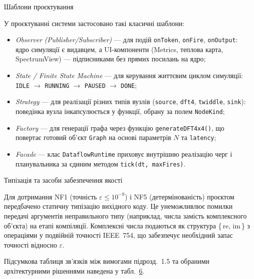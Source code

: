\protect{}\label{_Toc228121448}{}Шаблони проєктування

У проєктуванні системи застосовано такі класичні шаблони:

\begin{itemize}
\item
  \emph{Observer (Publisher/Subscriber)} --- для подій \texttt{onToken},
  \texttt{onFire}, \texttt{onOutput}: ядро симуляції є видавцем, а
  UI-компоненти (Metrics, теплова карта, SpectrumView) --- підписниками
  без прямих посилань на ядро;
\item
  \emph{State / Finite State Machine} --- для керування життєвим циклом
  симуляції: \texttt{IDLE} \(\rightarrow\) \texttt{RUNNING}
  \(\rightarrow\) \texttt{PAUSED} \(\rightarrow\) \texttt{DONE};
\item
  \emph{Strategy} --- для реалізації різних типів вузлів
  (\texttt{source}, \texttt{dft4}, \texttt{twiddle}, \texttt{sink}):
  поведінка вузла інкапсулюється у функції, обрану за полем
  \texttt{NodeKind};
\item
  \emph{Factory} --- для генерації графа через функцію
  \texttt{generateDFT4x4()}, що повертає готовий об'єкт \texttt{Graph}
  на основі параметрів \(N\) та \texttt{latency};
\item
  \emph{Facade} --- клас \texttt{DataflowRuntime} приховує внутрішню
  реалізацію черг і планувальника за єдиним методом
  \texttt{tick(dt,\ maxFires)}.
\end{itemize}

Типізація та засоби забезпечення якості

Для дотримання NF1 (точність \(\varepsilon \leq 10^{- 9}\)) і NF5
(детермінованість) проєктом передбачено статичну типізацію вихідного
коду. Це унеможливлює помилки передачі аргументів неправильного типу
(наприклад, числа замість комплексного об'єкта) на етапі компіляції.
Комплексні числа подаються як структура \{ re, im \} з операціями у
подвійній точності IEEE~754, що забезпечує необхідний запас точності
відносно \(\varepsilon\).

Підсумкова таблиця зв'язків між вимогами підрозд.~1.5 та обраними
архітектурними рішеннями наведена у табл.~\hyperref[tab:req_to_tech]{6}.

